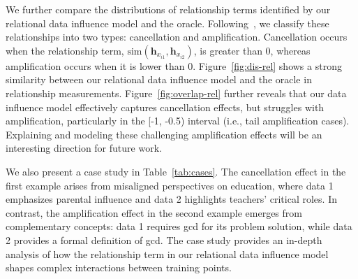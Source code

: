 We further compare the distributions of relationship terms identified by our relational data influence model and the oracle. Following~\citet{hu2024most}, we classify these relationships into two types: cancellation and amplification. Cancellation occurs when the relationship term, $\text{sim}(\textbf{h}_{x_{i1}},\textbf{h}_{x_{i2}})$, is greater than 0, whereas amplification occurs when it is lower than 0.
Figure~\ref{fig:dis-rel} shows a strong similarity between our relational data influence model and the oracle in relationship measurements. Figure~\ref{fig:overlap-rel} further reveals that our data influence model effectively captures cancellation effects, but struggles with amplification, particularly in the [-1, -0.5) interval (i.e., tail amplification cases). Explaining and modeling these challenging amplification effects will be an interesting direction for future work. 



We also present a case study in Table~\ref{tab:cases}. The cancellation effect in the first example arises from misaligned perspectives on education, where data 1 emphasizes parental influence and data 2 highlights teachers' critical roles. In contrast, the amplification effect in the second example emerges from complementary concepts: data 1 requires gcd for its problem solution, while data 2 provides a formal definition of gcd.
The case study provides an in-depth analysis of how the relationship term in our relational data influence model shapes complex interactions between training points.

